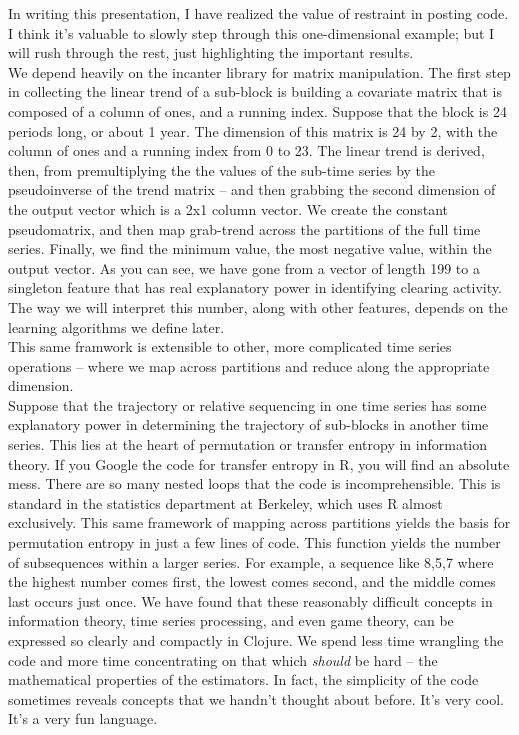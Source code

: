 \documentclass{article}
\begin{document}
In writing this presentation, I have realized the value of restraint
in posting code.  I think it's valuable to slowly step through this
one-dimensional example; but I will rush through the rest, just
highlighting the important results.\\

We depend heavily on the incanter library for matrix manipulation.
The first step in collecting the linear trend of a sub-block is
building a covariate matrix that is composed of a column of ones, and
a running index.  Suppose that the block is 24 periods long, or about
1 year.  The dimension of this matrix is 24 by 2, with the column of
ones and a running index from 0 to 23.  The linear trend is derived,
then, from premultiplying the the values of the sub-time series by the
pseudoinverse of the trend matrix -- and then grabbing the second
dimension of the output vector which is a 2x1 column vector.  We
create the constant pseudomatrix, and then map grab-trend across the
partitions of the full time series.  Finally, we find the minimum
value, the most negative value, within the output vector.  As you can
see, we have gone from a vector of length 199 to a singleton feature
that has real explanatory power in identifying clearing activity.  The
way we will interpret this number, along with other features, depends
on the learning algorithms we define later.\\

This same framwork is extensible to other, more complicated time
series operations -- where we map across partitions and reduce along
the appropriate dimension.\\

Suppose that the trajectory or relative sequencing in one time series
has some explanatory power in determining the trajectory of sub-blocks
in another time series.  This lies at the heart of permutation or
transfer entropy in information theory.  If you Google the code for
transfer entropy in R, you will find an absolute mess.  There are so
many nested loops that the code is incomprehensible.  This is standard
in the statistics department at Berkeley, which uses R almost
exclusively.  This same framework of mapping across partitions yields
the basis for permutation entropy in just a few lines of code.  This
function yields the number of subsequences within a larger series.
For example, a sequence like 8,5,7 where the highest number comes
first, the lowest comes second, and the middle comes last occurs just
once.  We have found that these reasonably difficult concepts in
information theory, time series processing, and even game theory, can
be expressed so clearly and compactly in Clojure. We spend less time
wrangling the code and more time concentrating on that which \emph{should}
be hard -- the mathematical properties of the estimators.  In fact,
the simplicity of the code sometimes reveals concepts that we handn't
thought about before.  It's very cool.  It's a very fun language.\\
\end{document}
